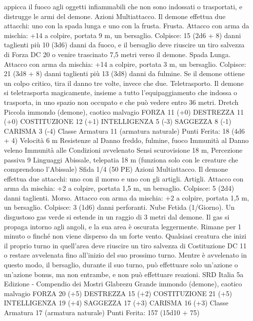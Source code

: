 \begin{multicols}{2}
appicca il fuoco agli oggetti infiammabili che non sono indossati
o trasportati, e distrugge le armi del demone.
Azioni
Multiattacco. Il demone effettua due attacchi: uno con la spada
lunga e uno con la frusta.
Frusta. Attacco con arma da mischia: +14 a colpire, portata 9 m,
un bersaglio.
Colpisce: 15 (2d6 + 8) danni taglienti più 10 (3d6) danni da
fuoco, e il bersaglio deve riuscire un tiro salvezza di Forza DC
20 o venire trascinato 7,5 metri verso il demone.
Spada Lunga. Attacco con arma da mischia: +14 a colpire,
portata 3 m, un bersaglio.
Colpisce: 21 (3d8 + 8) danni taglienti più 13 (3d8) danni da
fulmine. Se il demone ottiene un colpo critico, tira il danno tre
volte, invece che due.
Teletrasporto. Il demone si teletrasporta magicamente, insieme a
tutto l’equipaggiamento che indossa o trasporta, in uno spazio
non occupato e che può vedere entro 36 metri.
Dretch
Piccola immondo (demone), caotico malvagio
FORZA 11 (+0)
DESTREZZA 11 (+0)
COSTITUZIONE 12 (+1)
INTELLIGENZA 5 (-3)
SAGGEZZA 8 (-1)
CARISMA 3 (-4)
Classe Armatura 11 (armatura naturale)
\hspace*{0pt}\hfill{Punti Ferita}: 18 (4d6 + 4)
Velocità 6 m
Resistenze al Danno freddo, fulmine, fuoco
Immunità al Danno veleno
Immunità alle Condizioni avvelenato
Sensi scurovisione 18 m, Percezione passiva 9
Linguaggi Abissale, telepatia 18 m (funziona solo con le
creature che comprendono l’Abissale)
Sfida 1/4 (50 PE)
Azioni
Multiattacco. Il demone effettua due attacchi: uno con il morso e
uno con gli artigli.
Artigli. Attacco con arma da mischia: +2 a colpire, portata 1,5
m, un bersaglio.
Colpisce: 5 (2d4) danni taglienti.
Morso. Attacco con arma da mischia: +2 a colpire, portata 1,5
m, un bersaglio.
Colpisce: 3 (1d6) danni perforanti.
Nube Fetida (1/Giorno). Un disgustoso gas verde si estende in
un raggio di 3 metri dal demone. Il gas si propaga intorno agli
angoli, e la sua area è oscurata leggermente. Rimane per 1
minuto o finché non viene disperso da un forte vento. Qualsiasi
creatura che inizi il proprio turno in quell’area deve riuscire un
tiro salvezza di Costituzione DC 11 o restare avvelenata fino
all’inizio del suo prossimo turno. Mentre è avvelenato in questo
modo, il bersaglio, durante il suo turno, può effettuare solo
un’azione o un’azione bonus, ma non entrambe, e non può
effettuare reazioni. 
SRD Italia 5a Edizione - Compendio dei Mostri
Glabrezu
Grande immondo (demone), caotico malvagio
FORZA 20 (+5)
DESTREZZA 15 (+2)
COSTITUZIONE 21 (+5)
INTELLIGENZA 19 (+4)
SAGGEZZA 17 (+3)
CARISMA 16 (+3)
Classe Armatura 17 (armatura naturale)
\hspace*{0pt}\hfill{Punti Ferita}: 157 (15d10 + 75)

\end{multicols}
